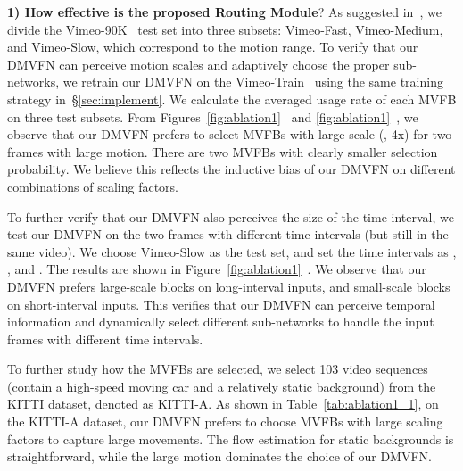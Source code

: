 \documentclass[10pt,twocolumn,letterpaper]{article}
\begin{document}
\noindent
\textbf{1) How effective is the proposed Routing Module}? As suggested in~\cite{xiang2020zooming,TMNet2021}, we divide the Vimeo-90K~\cite{vimeo} test set into three subsets: Vimeo-Fast, Vimeo-Medium, and Vimeo-Slow, which correspond to the motion range. To verify that our DMVFN can perceive motion scales and adaptively choose the proper sub-networks, we retrain our DMVFN on the Vimeo-Train~\cite{vimeo} using the same training strategy in~\S\ref{sec:implement}. We calculate the averaged usage rate of each MVFB on three test subsets. From Figures~\ref{fig:ablation1}~ and \ref{fig:ablation1}~, we observe that our DMVFN prefers to select MVFBs with large scale (\eg, 4x) for two frames with large motion. There are two MVFBs with clearly smaller selection probability. We believe this reflects the inductive bias of our DMVFN on different combinations of scaling factors.

To further verify that our DMVFN also perceives the size of the time interval, we test our DMVFN on the two frames with different time intervals (but still in the same video). We choose Vimeo-Slow as the test set, and set the time intervals as , , and . The results are shown in Figure~\ref{fig:ablation1}~. We observe that our DMVFN prefers large-scale blocks on long-interval inputs, and small-scale blocks on short-interval inputs. This verifies that our DMVFN can perceive temporal information and dynamically select different sub-networks to handle the input frames with different time intervals.

To further study how the MVFBs are selected, we select 103 video sequences (contain a high-speed moving car and a relatively static background) from the KITTI dataset, denoted as KITTI-A. As shown in Table~\ref{tab:ablation1_1}, on the KITTI-A dataset, our DMVFN prefers to choose MVFBs with large scaling factors to capture large movements. The flow estimation for static backgrounds is straightforward, while the large motion dominates the choice of our DMVFN.

\begin{table}[!htb]
\vspace{-2mm}
  \centering
  \caption{\textbf{Average usage rate () of MVFBs in our DMVFN.}}
  \label{tab:ablation1_1}
\end{table}
\end{document}
